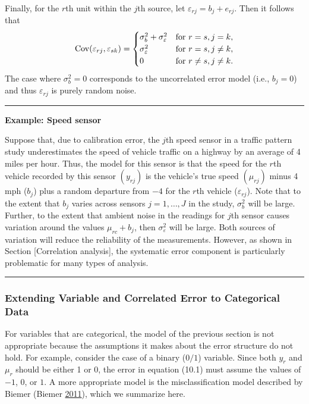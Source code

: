\documentclass[]{krantz}
\begin{document}
Finally, for the \(r\)th unit within the \(j\)th source, let
\(\varepsilon_{rj} = b_j + e_{rj}\). Then it follows that
\[\label{eq:10-1.2}
\begin{array}{lcl@{\quad}l}
\mathrm{Cov}(\varepsilon_{rj} ,\varepsilon_{sk}) =
\begin{cases}
\sigma_b^2 + \sigma_\varepsilon^2 & \text{for } r = s,j = k, \\
\sigma_\varepsilon^2&\text{for } r = s,j \ne k,  \\
 0 & \text{for } r \ne s,j \ne k.
 \end{cases}
\end{array}\] The case where \(\sigma_b^2 = 0\) corresponds to the
uncorrelated error model (i.e., \(b_j = 0\)) and thus
\(\varepsilon_{rj}\) is purely random noise.

\begin{center}\rule{0.5\linewidth}{\linethickness}\end{center}

\textbf{Example: Speed sensor}

Suppose that, due to calibration error, the \(j\)th speed sensor in a
traffic pattern study underestimates the speed of vehicle traffic on a
highway by an average of 4 miles per hour. Thus, the model for this
sensor is that the speed for the \(r\)th vehicle recorded by this sensor
\((y_{rj})\) is the vehicle's true speed \((\mu_{rj})\) minus 4 mph
(\(b_{j}\)) plus a random departure from \(-4\) for the \(r\)th vehicle
(\(\varepsilon_{rj}\)). Note that to the extent that \(b_{j}\) varies
across sensors \(j = 1,\ldots ,J\) in the study, \(\sigma_b^2\) will be
large. Further, to the extent that ambient noise in the readings for
\(j\)th sensor causes variation around the values \(\mu_{rc} + b_j\),
then \(\sigma_\varepsilon^2\) will be large. Both sources of variation
will reduce the reliability of the measurements. However, as shown in
Section {[}Correlation analysis{]}, the systematic error component is
particularly problematic for many types of analysis.

\begin{center}\rule{0.5\linewidth}{\linethickness}\end{center}

\subsubsection{Extending Variable and Correlated Error to Categorical
Data}\label{sec:10-4.2.2}

For variables that are categorical, the model of the previous section is
not appropriate because the assumptions it makes about the error
structure do not hold. For example, consider the case of a binary
(\(0/1\)) variable. Since both \(y_r\) and \(\mu_r\) should be either 1
or 0, the error in equation (10.1) must assume the values of \(-1\),
\(0\), or \(1\). A more appropriate model is the misclassification model
described by Biemer (Biemer
\protect\hyperlink{ref-biemer2011latent}{2011}), which we summarize
here.
\end{document}
